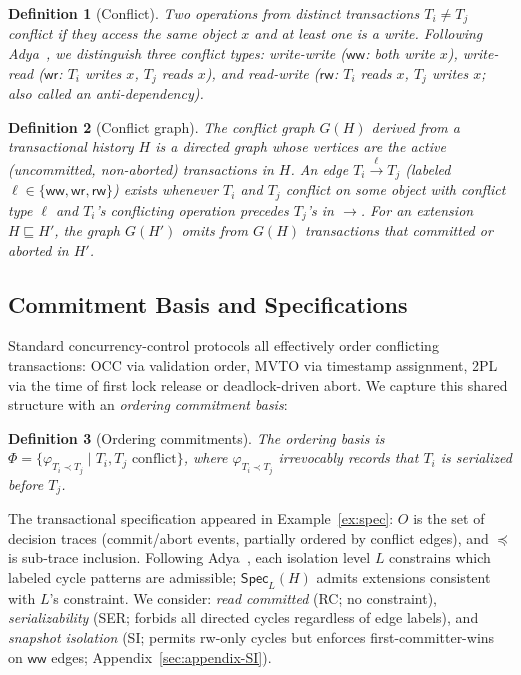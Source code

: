 \documentclass[acmsmall,review,anonymous]{acmart}
\newcommand{\Spec}{\mathsf{Spec}}
\newcommand{\Ord}{\preceq}
\newtheorem{definition}{Definition}
\theoremstyle{remark}
\numberwithin{definition}{section}
\numberwithin{theorem}{section}
\numberwithin{lemma}{section}
\numberwithin{corollary}{section}
\numberwithin{remark}{section}
\numberwithin{example}{section}
\numberwithin{observation}{section}
\numberwithin{assumption}{section}
\begin{document}
\begin{definition}[Conflict]
  \label{def:conflict}
  Two operations from distinct transactions $T_i \neq T_j$ \emph{conflict} if
  they access the same object $x$ and at least one is a write.
  Following Adya~\cite{adya1999weak}, we distinguish three conflict types:
  \emph{write-write} ($\mathsf{ww}$: both write $x$),
  \emph{write-read} ($\mathsf{wr}$: $T_i$ writes $x$, $T_j$ reads $x$), and
  \emph{read-write} ($\mathsf{rw}$: $T_i$ reads $x$, $T_j$ writes $x$;
  also called an \emph{anti-dependency}).
\end{definition}

\begin{definition}[Conflict graph]
  \label{def:conflict-graph}
  The \emph{conflict graph} $G(H)$ derived from a transactional
  history $H$ is a directed graph whose vertices are the \emph{active}
  (uncommitted, non-aborted) transactions in $H$.
  An edge $T_i \xrightarrow{\ell} T_j$ (labeled
  $\ell \in \{\mathsf{ww}, \mathsf{wr}, \mathsf{rw}\}$) exists
  whenever $T_i$ and $T_j$ conflict on some object with conflict type
  $\ell$ and $T_i$'s conflicting operation precedes $T_j$'s in
  $\rightarrow$.
  For an extension $H \sqsubseteq H'$, the graph $G(H')$ omits from
  $G(H)$ transactions that committed or aborted in $H'$.
\end{definition}

\subsection{Commitment Basis and Specifications}
\label{sec:scheduling-basis}

Standard concurrency-control protocols all effectively order
conflicting transactions: OCC
via validation order, MVTO via timestamp assignment, 2PL via the time of first lock release
or deadlock-driven abort.
We capture this shared structure with an \emph{ordering commitment
basis}:

\begin{definition}[Ordering commitments]
  \label{def:commit-commitment}
  The ordering basis is
  $\Phi = \{\varphi_{T_i \prec T_j} \mid T_i, T_j \text{ conflict}\}$,
  where $\varphi_{T_i \prec T_j}$ irrevocably records that $T_i$ is
  serialized before $T_j$.
  \label{def:ordering-commitment}%
\end{definition}

\noindent
The transactional specification appeared in Example~\ref{ex:spec}:
$O$ is the set of decision traces (commit/abort
events, partially ordered by conflict edges), and $\Ord$ is
sub-trace inclusion.
Following Adya~\cite{adya1999weak}, each isolation level $L$
constrains which labeled cycle patterns are admissible;
$\Spec_L(H)$ admits extensions consistent with $L$'s constraint.
We consider:
\emph{read committed} (RC; no constraint),
\emph{serializability} (SER; forbids all directed cycles regardless of
edge labels), and \emph{snapshot isolation} (SI; permits rw-only
cycles but enforces first-committer-wins on $\mathsf{ww}$ edges;
Appendix~\ref{sec:appendix-SI}).
\end{document}
